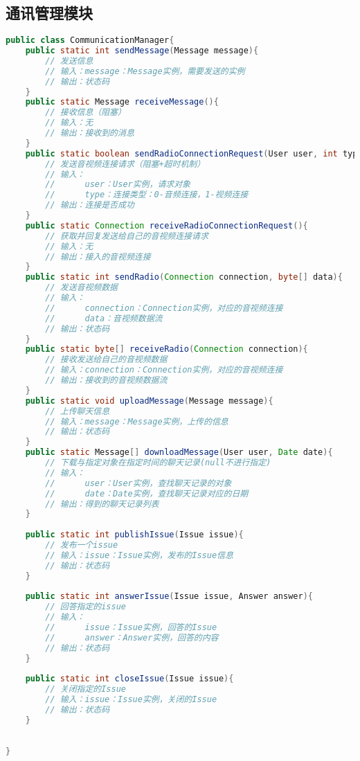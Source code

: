 \subsection{\color{red}通讯管理模块}
{\color{red}

\begin{lstlisting}[language=Java, caption=通讯管理模块接口]
public class CommunicationManager{
    public static int sendMessage(Message message){
        // 发送信息
        // 输入：message：Message实例，需要发送的实例
        // 输出：状态码
    }
    public static Message receiveMessage(){
        // 接收信息（阻塞）
        // 输入：无
        // 输出：接收到的消息
    }
    public static boolean sendRadioConnectionRequest(User user, int type){
        // 发送音视频连接请求（阻塞+超时机制）
        // 输入：
        //      user：User实例，请求对象
        //      type：连接类型：0-音频连接，1-视频连接
        // 输出：连接是否成功
    }
    public static Connection receiveRadioConnectionRequest(){
        // 获取并回复发送给自己的音视频连接请求
        // 输入：无
        // 输出：接入的音视频连接
    }
    public static int sendRadio(Connection connection, byte[] data){
        // 发送音视频数据
        // 输入：
        //      connection：Connection实例，对应的音视频连接
        //      data：音视频数据流
        // 输出：状态码
    }
    public static byte[] receiveRadio(Connection connection){
        // 接收发送给自己的音视频数据
        // 输入：connection：Connection实例，对应的音视频连接
        // 输出：接收到的音视频数据流
    }
    public static void uploadMessage(Message message){
        // 上传聊天信息
        // 输入：message：Message实例，上传的信息
        // 输出：状态码
    }
    public static Message[] downloadMessage(User user, Date date){
        // 下载与指定对象在指定时间的聊天记录(null不进行指定)
        // 输入：
        //      user：User实例，查找聊天记录的对象
        //      date：Date实例，查找聊天记录对应的日期
        // 输出：得到的聊天记录列表
    }
    
    public static int publishIssue(Issue issue){
        // 发布一个issue
        // 输入：issue：Issue实例，发布的Issue信息
        // 输出：状态码
    }
    
    public static int answerIssue(Issue issue, Answer answer){
        // 回答指定的issue
        // 输入：
        //      issue：Issue实例，回答的Issue
        //      answer：Answer实例，回答的内容
        // 输出：状态码
    }
    
    public static int closeIssue(Issue issue){
        // 关闭指定的Issue
        // 输入：issue：Issue实例，关闭的Issue
        // 输出：状态码
    }
    
    
}
\end{lstlisting}
}


